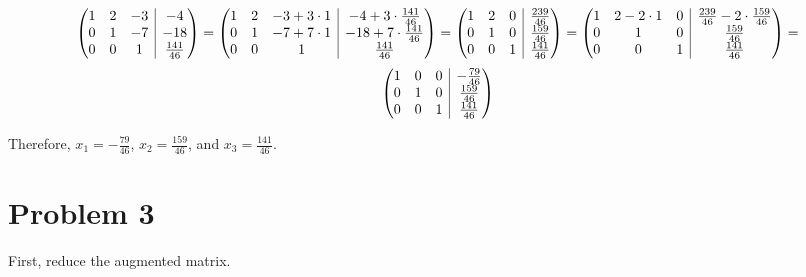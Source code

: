 \documentclass{article}
\makeatletter
\newenvironment{amatrix}[1]{\left(\begin{array}{@{}*{#1}{c}|c@{}}}{\end{array}\right)}
\makeatother
\begin{document}
\begin{equation*}
  \begin{amatrix}{3}
    1 & 2 & -3 & -4 \\
    0 & 1 & -7 & -18 \\
    0 & 0 & 1 & \frac{141}{46}
  \end{amatrix} =
  \begin{amatrix}{3}
    1 & 2 & -3 + 3 \cdot 1 & -4 + 3 \cdot \frac{141}{46} \\
    0 & 1 & -7 + 7 \cdot 1 & -18 + 7 \cdot \frac{141}{46} \\
    0 & 0 & 1 & \frac{141}{46}
  \end{amatrix} =
  \begin{amatrix}{3}
    1 & 2 & 0 & \frac{239}{46} \\
    0 & 1 & 0 & \frac{159}{46} \\
    0 & 0 & 1 & \frac{141}{46}
  \end{amatrix} =
  \begin{amatrix}{3}
    1 & 2 - 2 \cdot 1 & 0 & \frac{239}{46} - 2 \cdot \frac{159}{46} \\
    0 & 1 & 0 & \frac{159}{46} \\
    0 & 0 & 1 & \frac{141}{46}
  \end{amatrix} =
\end{equation*}
\begin{equation*}
  \begin{amatrix}{3}
    1 & 0 & 0 & -\frac{79}{46} \\
    0 & 1 & 0 & \frac{159}{46} \\
    0 & 0 & 1 & \frac{141}{46}
  \end{amatrix}
\end{equation*}

Therefore, $x_{1} = -\frac{79}{46}$, $x_{2} = \frac{159}{46}$, and $x_{3} = \frac{141}{46}$.

\section{Problem 3}

First, reduce the augmented matrix.
\end{document}
